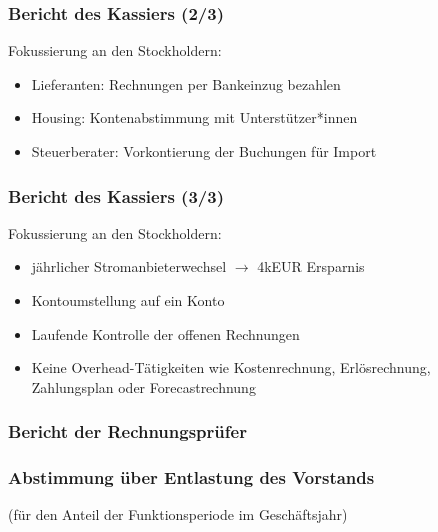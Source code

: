 \documentclass[17pt]{beamer} %
\begin{document}
\begin{frame}
	\frametitle{Bericht des Kassiers (2/3)}
	Fokussierung an den Stockholdern:
	\begin{itemize}
		\item Lieferanten: Rechnungen per Bankeinzug bezahlen
		\item Housing: Kontenabstimmung mit Unterstützer*innen
		\item Steuerberater: Vorkontierung der Buchungen für Import
	\end{itemize}
\end{frame}



\begin{frame}
	\frametitle{Bericht des Kassiers (3/3)}
	Fokussierung an den Stockholdern:
	\begin{itemize}
		\item jährlicher Stromanbieterwechsel $\rightarrow$ 4kEUR Ersparnis
		\item Kontoumstellung auf ein Konto 
		\item Laufende Kontrolle der offenen Rechnungen
		\item Keine Overhead-Tätigkeiten wie Kostenrechnung, Erlösrechnung, Zahlungsplan oder Forecastrechnung
	\end{itemize}
\end{frame}



\begin{frame}
	\frametitle{Bericht der Rechnungsprüfer}
\end{frame}



\begin{frame}
	\frametitle{Abstimmung über Entlastung des Vorstands}
	(für den Anteil der Funktionsperiode im Geschäftsjahr)
\end{frame}
\end{document}

